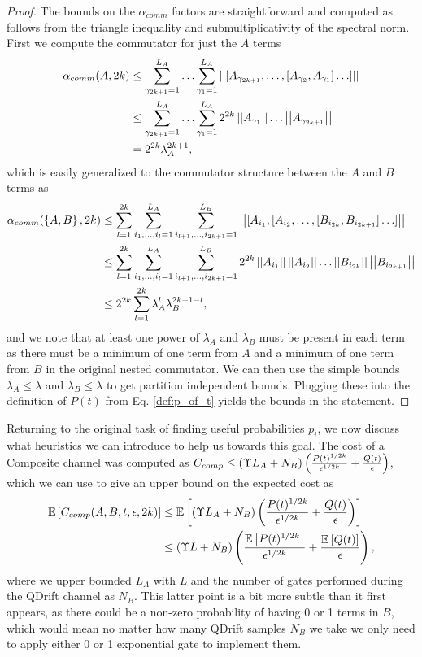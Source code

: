 \begin{lemma}
\begin{proof}
The bounds on the $\alpha_{comm}$ factors are straightforward and computed as follows from the triangle inequality and submultiplicativity of the spectral norm. First we compute the commutator for just the $A$ terms
\begin{align}
    \alpha_{comm}(A, 2k) &\leq \sum_{\gamma_{2k+1}=1}^{L_A} \ldots \sum_{\gamma_1 =1}^{L_A} ||[A_{\gamma_{2k+1}}, \ldots,[A_{\gamma_2}, A_{\gamma_1}]\ldots] || \\
    &\leq \sum_{\gamma_{2k+1}=1}^{L_A} \ldots \sum_{\gamma_1 =1}^{L_A} 2^{2k} \left| \left| A_{\gamma_1} \right| \right| \ldots \left| \left| A_{\gamma_{2k+1}} \right| \right| \\
    &= 2^{2k} \lambda_A^{2k+1}, \label{eq:alphaCommA}
\end{align}
which is easily generalized to the commutator structure between the $A$ and $B$ terms as
\begin{align}
    \alpha_{comm}(\left\{ A,B \right\},2k) &\leq \sum_{l=1}^{2k} \sum_{i_1, \ldots, i_{l} = 1}^{L_A} \sum_{i_{l+1},\ldots, i_{2k+1} = 1}^{L_B} \left| \left| [A_{i_1}, [A_{i_2},\ldots, [B_{i_{2k}}, B_{i_{2k+1}}]\ldots]  \right| \right| \\
    &\leq \sum_{l=1}^{2k} \sum_{i_1, \ldots, i_{l} = 1}^{L_A} \sum_{i_{l+1},\ldots, i_{2k+1} = 1}^{L_B} 2^{2k} \left| \left| A_{i_1} \right| \right| \left| \left| A_{i_2} \right| \right| \ldots \left| \left| B_{i_{2k}} \right| \right| \left| \left| B_{i_{2k+1}} \right| \right| \\
    &\leq 2^{2k} \sum_{l=1}^{2k} \lambda_A^{l} \lambda_B^{2k+1 - l}, \label{eq:alphaCommAB}
\end{align}
and we note that at least one power of $\lambda_A$ and $\lambda_B$ must be present in each term as there must be a minimum of one term from $A$ and a minimum of one term from $B$ in the original nested commutator. We can then use the simple bounds $\lambda_A \leq \lambda$ and $\lambda_B \leq \lambda$ to get partition independent bounds. Plugging these into the definition of $P(t)$ from Eq. \eqref{def:p_of_t} yields the bounds in the statement. 
\end{proof}
\end{lemma}

Returning to the original task of finding useful probabilities $p_i$, we now discuss what heuristics we can introduce to help us towards this goal. The cost of a Composite channel was computed as $C_{comp} \leq (\Upsilon L_A + N_B) \left( \frac{P(t)^{1/2k}}{\epsilon^{1/2k}} + \frac{Q(t)}{\epsilon} \right)$, which we can use to give an upper bound on the expected cost as
\begin{align}
    \mathbb{E}\left[ C_{comp}(A, B, t, \epsilon, 2k) \right] &\leq \mathbb{E}\left[ (\Upsilon L_A + N_B) \left( \frac{P(t)^{1/2k}}{\epsilon^{1/2k}} + \frac{Q(t)}{\epsilon} \right) \right] \\
    &\leq (\Upsilon L + N_B) \left( \frac{\mathbb{E}\left[ P(t)^{1/2k}  \right] }{\epsilon^{1/2k}} + \frac{\mathbb{E}\left[ Q(t) \right]}{\epsilon} \right),
\end{align}
where we upper bounded $L_A$ with $L$ and the number of gates performed during the QDrift channel as $N_B$. This latter point is a bit more subtle than it first appears, as there could be a non-zero probability of having 0 or 1 terms in $B$, which would mean no matter how many QDrift samples $N_B$ we take we only need to apply either 0 or 1 exponential gate to implement them. 


